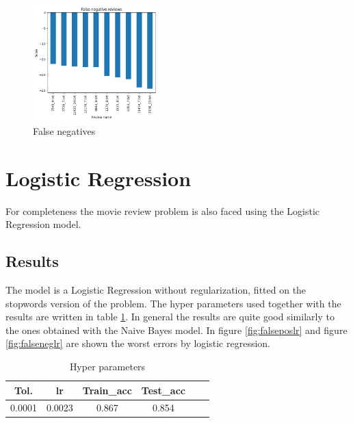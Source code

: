 \documentclass{article}
\begin{document}
\begin{multicols}{2}
    \begin{figure}[H]
        \centering
        \includegraphics[width=0.43\textwidth]{false negatives.png}
        \caption{\small False negatives}
        \label{fig:falseneg}
    \end{figure}


\section{Logistic Regression}
For completeness the movie review problem is also faced using the Logistic Regression model.
\subsection{Results}
The model is a Logistic Regression without regularization, fitted on the stopwords version of the problem. The hyper parameters used together with the results are written in table \ref{tab:hyper_lr}.
In general the results are quite good similarly to the ones obtained with the Naive Bayes model.
In figure \ref{fig:falseposlr} and figure \ref{fig:falseneglr} are shown the worst errors by logistic regression. 

    \begin{table}[H]
        \centering
        \small
        \caption{\small Hyper parameters}
        \label{tab:hyper_lr}
        \begin{tabular}{ |c|c|c|c|c|c|} 
        \hline
        \textbf{Tol.}  & \textbf{lr} & \textbf{Train\_acc} & \textbf{Test\_acc}\\ \hline
         0.0001 & 0.0023 & 0.867 & 0.854 \\ \hline
        \end{tabular}
    \end{table}




\end{multicols}
\end{document}
